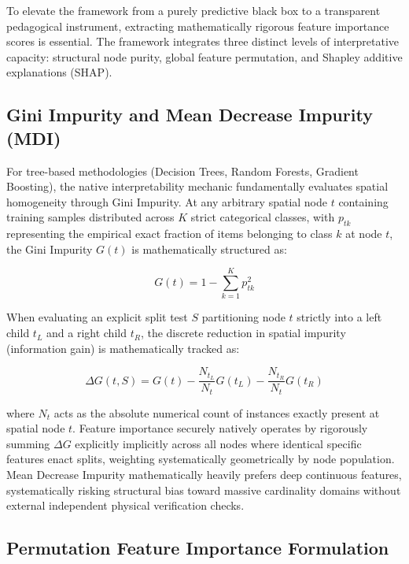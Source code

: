 \documentclass[conference]{IEEEtran}
\begin{document}
To elevate the framework from a purely predictive black box to a transparent pedagogical instrument, extracting mathematically rigorous feature importance scores is essential. The framework integrates three distinct levels of interpretative capacity: structural node purity, global feature permutation, and Shapley additive explanations (SHAP).

\subsection{Gini Impurity and Mean Decrease Impurity (MDI)}

For tree-based methodologies (Decision Trees, Random Forests, Gradient Boosting), the native interpretability mechanic fundamentally evaluates spatial homogeneity through Gini Impurity. At any arbitrary spatial node $t$ containing training samples distributed across $K$ strict categorical classes, with $p_{tk}$ representing the empirical exact fraction of items belonging to class $k$ at node $t$, the Gini Impurity $G(t)$ is mathematically structured as:

\begin{equation}
G(t) = 1 - \sum_{k=1}^K p_{tk}^2
\end{equation}

When evaluating an explicit split test $S$ partitioning node $t$ strictly into a left child $t_L$ and a right child $t_R$, the discrete reduction in spatial impurity (information gain) is mathematically tracked as:

\begin{equation}
\Delta G(t, S) = G(t) - \frac{N_{t_L}}{N_t} G(t_L) - \frac{N_{t_R}}{N_t} G(t_R)
\end{equation}

where $N_t$ acts as the absolute numerical count of instances exactly present at spatial node $t$. Feature importance securely natively operates by rigorously summing $\Delta G$ explicitly implicitly across all nodes where identical specific features enact splits, weighting systematically geometrically by node population. Mean Decrease Impurity mathematically heavily prefers deep continuous features, systematically risking structural bias toward massive cardinality domains without external independent physical verification checks.

\subsection{Permutation Feature Importance Formulation}
\end{document}
